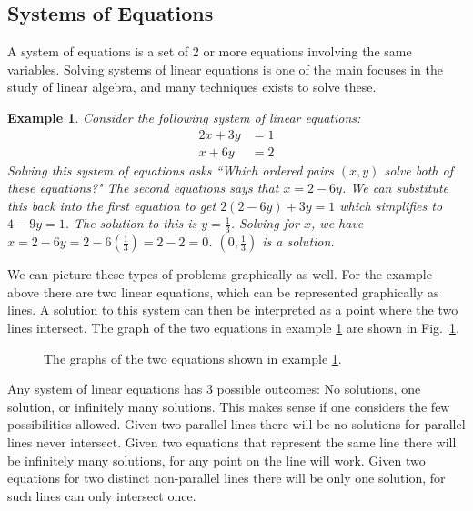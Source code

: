 \documentclass[oneside]{book}
\theoremstyle{mystyle}
\newtheorem{example}{Example}[section]
\begin{document}
\subsection{Systems of Equations}
A system of equations is a set of 2 or more equations involving the same variables. Solving systems of linear equations is one of the main focuses in the study of linear algebra, and many techniques exists to solve these.
\begin{example}
\label{example:north_shore_example_of_a_system_of_linear_equations}Consider the following system of linear equations:
\begin{align*}
    2x+3y &=1\\
    x+6y &= 2
\end{align*}
Solving this system of equations asks ``Which ordered pairs $(x,y)$ solve both of these equations?" The second equations says that $x=2-6y$. We can substitute this back into the first equation to get $2(2-6y)+3y=1$ which simplifies to $4-9y = 1$. The solution to this is $y= \frac{1}{3}$. Solving for $x$, we have $x = 2 - 6y = 2 - 6(\frac{1}{3}) = 2-2 = 0$. $(0,\frac{1}{3})$ is a solution.
\end{example}
We can picture these types of problems graphically as well. For the example above there are two linear equations, which can be represented graphically as lines. A solution to this system can then be interpreted as a point where the two lines intersect. The graph of the two equations in example \ref{example:north_shore_example_of_a_system_of_linear_equations} are shown in Fig.~\ref{fig:north_shore_systems_of_linear_equations}.
\begin{figure}[H]
    \centering
    \caption{The graphs of the two equations shown in example \ref{example:north_shore_example_of_a_system_of_linear_equations}.}
    \label{fig:north_shore_systems_of_linear_equations}
\end{figure}
Any system of linear equations has 3 possible outcomes: No solutions, one solution, or infinitely many solutions. This makes sense if one considers the few possibilities allowed. Given two parallel lines there will be no solutions for parallel lines never intersect. Given two equations that represent the same line there will be infinitely many solutions, for any point on the line will work. Given two equations for two distinct non-parallel lines there will be only one solution, for such lines can only intersect once.
\end{document}
